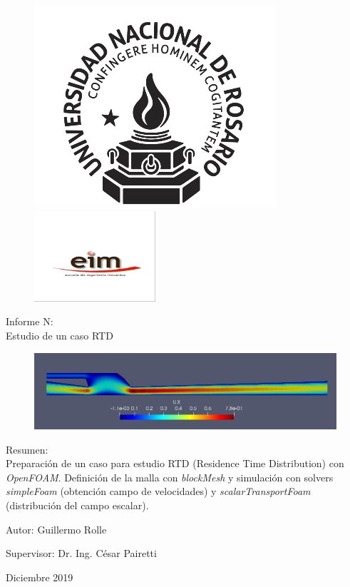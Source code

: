 \documentclass{article}
\begin{document}
\begin{titlepage}
  \begin{figure}[t]
    \centering
    \includegraphics[]{Figuras/00_unr.png}
    \hspace{0.15\textwidth}
    \includegraphics[width=0.4\textwidth]{Figuras/00_eim.png}
\end{figure}
  
\begin{center}
    {\Huge Informe N:\\ Estudio de un caso RTD \par}
    
    
    \bigskip\bigskip\bigskip\bigskip\bigskip\bigskip
    \begin{figure}[h]
        \centering
        \includegraphics[width=1\textwidth]{Figuras/00_caso_intro.png}
    \end{figure}
    \bigskip\bigskip
    {\Huge Resumen:\\}
    Preparación de un caso para estudio RTD (Residence Time Distribution) con \textit{OpenFOAM}. 
    Definición de la malla con \textit{blockMesh} y simulación con solvers \textit{simpleFoam} (obtención campo de velocidades) y \textit{scalarTransportFoam} (distribución del campo escalar).
    
    \vspace*{\fill}
    Autor: Guillermo Rolle\par
    Supervisor: Dr. Ing. César Pairetti\par
    \bigskip
    Diciembre 2019
\end{center}
\end{titlepage}
\end{document}

